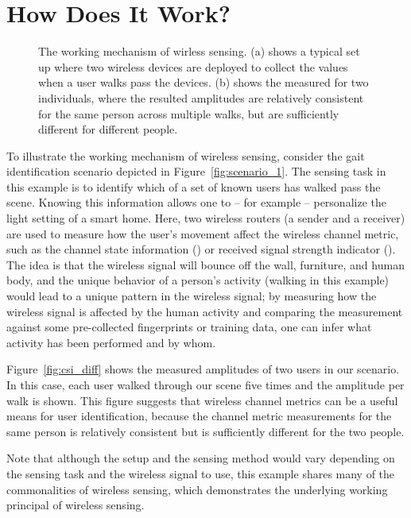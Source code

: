 \section{How Does It Work?\label{sec:mechanism}}
\begin{figure} [t!]
       \centering
     \caption{The working mechanism of wirless sensing. (a) shows a typical set up where two wireless devices are deployed
     to collect the \CSI values when a user walks pass the devices. (b)  shows the measured \CSI  for two
     individuals, where the resulted \CSI amplitudes are relatively consistent for the same person across multiple walks, but are sufficiently different for different people.}
     \label{fig:csi_demo}
\end{figure}


To illustrate the working mechanism of wireless sensing, consider the gait identification scenario depicted in Figure~\ref{fig:scenario_1}.
The sensing task in this example is to identify which of a set of known users has walked pass the scene. Knowing this information allows
one to -- for example -- personalize the light setting of a smart home. Here, two wireless routers (a sender and a receiver) are used to
measure how the user's movement affect the wireless channel metric, such as the channel state information (\CSI) or received signal
strength indicator (\RSSI). The idea is that the wireless signal will bounce off the wall, furniture, and human body, and the unique
behavior of a person's activity (walking in this example) would lead to a unique pattern in the wireless signal; by measuring how the
wireless signal is affected by the human activity and comparing the measurement against some pre-collected fingerprints or training data,
one can infer what activity has been performed and by whom.

Figure~\ref{fig:csi_diff} shows the measured \CSI amplitudes of two users in our scenario. In this case, each user walked through our scene
five times and the \CSI amplitude per walk is shown. This figure suggests that wireless channel metrics can be a useful means for user
identification, because the channel metric measurements for the same person is relatively consistent but is sufficiently different for the
two  people.

Note that although the setup and the sensing method would vary depending on the sensing task and the wireless signal to use, this example
shares many of the commonalities of wireless sensing, which demonstrates the underlying working principal of wireless sensing.
